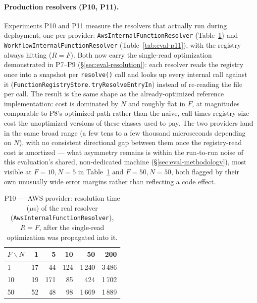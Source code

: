 \paragraph{Production resolvers (P10, P11).}
Experiments P10 and P11 measure the resolvers that actually run during deployment, one per
provider: \texttt{Aws\allowbreak Internal\allowbreak Function\allowbreak Resolver} (Table~\ref{tab:eval-p10}) and
\texttt{Workflow\allowbreak Internal\allowbreak Function\allowbreak Resolver} (Table~\ref{tab:eval-p11}), with the
registry always hitting ($R{=}F$). Both now carry the single-read optimization demonstrated in
P7--P9 (\S\ref{sec:eval-resolution}): each resolver reads the registry once into a snapshot per
\texttt{resolve()} call and looks up every internal call against it
(\texttt{FunctionRegistryStore.tryResolveEntryIn}) instead of re-reading the file per call. The
result is the same shape as the already-optimized reference implementation: cost is dominated by
$N$ and roughly flat in $F$, at magnitudes comparable to P8's optimized path rather than the
naive, call-times-registry-size cost the unoptimized versions of these classes used to pay. The
two providers land in the same broad range (a few tens to a few thousand microseconds depending on
$N$), with no consistent directional gap between them once the registry-read cost is amortized
--- what asymmetry remains is within the run-to-run noise of this evaluation's shared,
non-dedicated machine (\S\ref{sec:eval-methodology}), most visible at $F{=}10,N{=}5$ in
Table~\ref{tab:eval-p10} and $F{=}50,N{=}50$, both flagged by their own unusually wide error
margins rather than reflecting a code effect.

\begin{table}[htbp]
  \centering
  \caption{P10 --- AWS provider: resolution time ($\mu$s) of the real resolver
  (\texttt{Aws\allowbreak Internal\allowbreak Function\allowbreak Resolver}), $R{=}F$, after the
  single-read optimization was propagated into it.}
  \label{tab:eval-p10}
  \begin{tabular}{lrrrrr}
    \hline
    $F\backslash N$ & 1 & 5 & 10 & 50 & 200 \\
    \hline
    1  & 17 & 44  & 124 & 1\,240 & 3\,486 \\
    10 & 19 & 171 & 85  & 424    & 1\,702 \\
    50 & 52 & 48  & 98  & 1\,669 & 1\,889 \\
    \hline
  \end{tabular}
\end{table}

